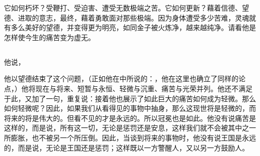 它如何朽坏？受鞭打、受迫害、遭受无数极端之苦。它如何更新？藉着信德、望德、进取的意志，最终，藉着勇敢面对那些极端。因为身体遭受多少苦难，灵魂就有多么美好的望德，并变得更为明亮，如同金子被火炼净，越来越纯净。请看他是怎样使今生的痛苦变为虚无。\par


\subsection{}

他说，\par

他以望德结束了这个问题，（正如他在中所说的：，他在这里也确立了同样的论点，）他将现在与将来、短暂与永恒、轻微与沉重、痛苦与光荣并列。他还不满足于此，又加了一句，重复说：接着他也展示了如此巨大的痛苦如何成为轻微。那么如何轻微呢？因此，如果我们从看得见的事物中抽身，那么这现世将是轻微的，而将来的将是伟大的。但看不见的才是永远的。所以冠冕也是如此。他没有说痛苦是这样的，而是说，所有这一切，无论是惩罚还是安息，这样我们就不会被其中之一所膨胀，也不被另一个所压倒。因此，当谈到将来的事物时，他没有说王国是永远的，而是说，无论是王国还是惩罚；这样既以一方警醒人，又以另一方鼓励人。\par

